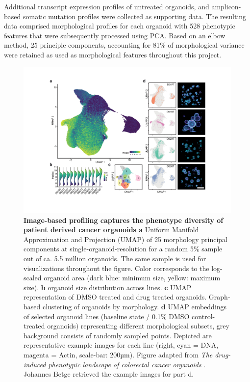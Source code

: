 \begin{flushleft}
Additional transcript expression profiles of untreated organoids, and amplicon-based somatic mutation profiles were collected as supporting data. The resulting data comprised morphological profiles for each organoid with 528 phenotypic features that were subsequently processed using PCA. Based on an elbow method, 25 principle components, accounting for 81\% of morphological variance were retained as used as morphological features throughout this project. 

\begin{figure}[h]
\centering
\includegraphics[width=\textwidth,
                height=\textheight,
                keepaspectratio]{figures/promise/pdf/fig_1_4.pdf}
\caption[Image-based profiling captures the phenotype diversity of patient derived cancer organoids]{\textbf{Image-based profiling captures the phenotype diversity of patient derived cancer organoids a} Uniform Manifold Approximation and Projection (UMAP) of 25 morphology principal components at single-organoid-resolution for a random 5\% sample out of ca. 5.5 million organoids. The same sample is used for visualizations throughout the figure. Color corresponds to the log-scaled organoid area (dark blue: minimum size, yellow: maximum size). \textbf{b} organoid size distribution across lines. \textbf{c} UMAP representation of DMSO treated and drug treated organoids. Graph-based clustering of organoids by morphology. \textbf{d} UMAP embeddings of selected organoid lines (baseline state / 0.1\% DMSO control-treated organoids) representing different morphological subsets, grey background consists of randomly sampled points. Depicted are representative example images for each line (right, cyan = DNA, magenta = Actin, scale-bar: 200µm). Figure adapted from \textit{The drug-induced phenotypic landscape of colorectal cancer organoids} \parencite{betgeDruginducedPhenotypicLandscape2022}. Johannes Betge retrieved the example images for part d.}
\label{fig_140}
\end{figure}
\bigbreak


\end{flushleft}
